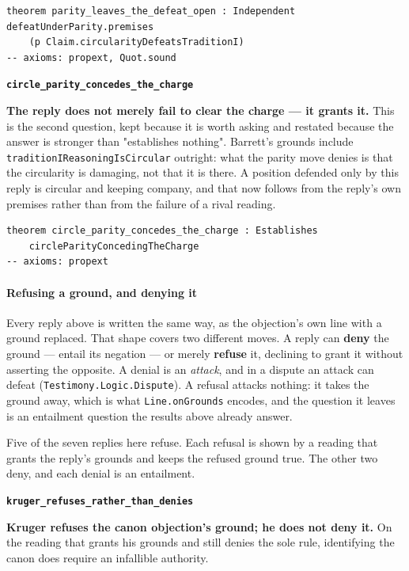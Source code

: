 \documentclass[11pt]{article}
\begin{document}
{\small\begin{verbatim}
theorem parity_leaves_the_defeat_open : Independent defeatUnderParity.premises
    (p Claim.circularityDefeatsTraditionI)
-- axioms: propext, Quot.sound
\end{verbatim}}
\par\medskip\noindent\textbf{\texttt{circle\_\allowbreak{}parity\_\allowbreak{}concedes\_\allowbreak{}the\_\allowbreak{}charge}}\par\nobreak\noindent
\textbf{The reply does not merely fail to clear the charge — it grants it.} This is the second question, kept because it is worth asking and restated because the answer is stronger than "establishes nothing". Barrett's grounds include \texttt{tradition\allowbreak{}IReasoning\allowbreak{}Is\allowbreak{}Circular} outright: what the parity move denies is that the circularity is damaging, not that it is there. A position defended only by this reply is circular and keeping company, and that now follows from the reply's own premises rather than from the failure of a rival reading.

{\small\begin{verbatim}
theorem circle_parity_concedes_the_charge : Establishes
    circleParityConcedingTheCharge
-- axioms: propext
\end{verbatim}}
\paragraph*{Refusing a ground, and denying it}
\leavevmode\par
Every reply above is written the same way, as the objection's own line with a ground replaced. That shape covers two different moves. A reply can \textbf{deny} the ground — entail its negation — or merely \textbf{refuse} it, declining to grant it without asserting the opposite. A denial is an \emph{attack}, and in a dispute an attack can defeat (\texttt{Testimony.Logic.Dispute}). A refusal attacks nothing: it takes the ground away, which is what \texttt{Line.on\allowbreak{}Grounds} encodes, and the question it leaves is an entailment question the results above already answer.

Five of the seven replies here refuse. Each refusal is shown by a reading that grants the reply's grounds and keeps the refused ground true. The other two deny, and each denial is an entailment.

\par\medskip\noindent\textbf{\texttt{kruger\_\allowbreak{}refuses\_\allowbreak{}rather\_\allowbreak{}than\_\allowbreak{}denies}}\par\nobreak\noindent
\textbf{Kruger refuses the canon objection's ground; he does not deny it.} On the reading that grants his grounds and still denies the sole rule, identifying the canon does require an infallible authority.
\end{document}
